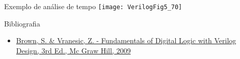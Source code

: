 \begin{frame}{Exemplo de análise de tempo} \centering
    \texttt{[image: VerilogFig5\_70]} 
\end{frame}

\begin{frame}{Bibliografia} 
	\begin{itemize}
		\item \href{https://www.google.com.br/search?q=filetype\%3Apdf+Fundamentals+of+Digital+Logic+with+Verilog+Design+&oq=filetype\%3Apdf}{Brown, S. \& Vranesic, Z. - Fundamentals of Digital Logic with Verilog Design, 3rd Ed., Mc Graw Hill, 2009}
	\end{itemize}
\end{frame}

\begin{frame}
	\titlepage
\end{frame} 

